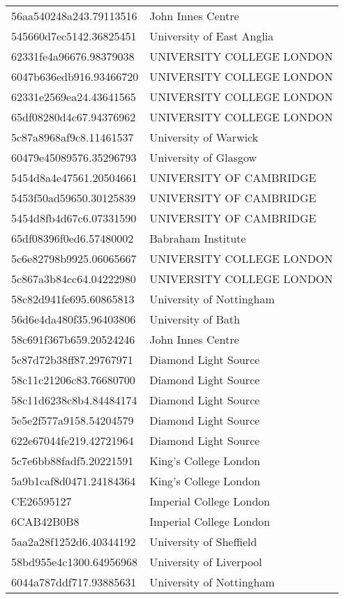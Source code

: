 \begin{tabular}{ll}
56aa540248a243.79113516 & John Innes Centre \\
545660d7ec5142.36825451 & University of East Anglia \\
62331fe4a96676.98379038 & UNIVERSITY COLLEGE LONDON \\
6047b636edb916.93466720 & UNIVERSITY COLLEGE LONDON \\
62331e2569ea24.43641565 & UNIVERSITY COLLEGE LONDON \\
65df08280d4c67.94376962 & UNIVERSITY COLLEGE LONDON \\
5c87a8968af9c8.11461537 & University of Warwick \\
60479e45089576.35296793 & University of Glasgow \\
5454d8a4e47561.20504661 & UNIVERSITY OF CAMBRIDGE \\
5453f50ad59650.30125839 & UNIVERSITY OF CAMBRIDGE \\
5454d8fb4d67c6.07331590 & UNIVERSITY OF CAMBRIDGE \\
65df08396f0ed6.57480002 & Babraham Institute \\
5c6e82798b9925.06065667 & UNIVERSITY COLLEGE LONDON \\
5c867a3b84cc64.04222980 & UNIVERSITY COLLEGE LONDON \\
58c82d941fe695.60865813 & University of Nottingham \\
56d6e4da480f35.96403806 & University of Bath \\
58c691f367b659.20524246 & John Innes Centre \\
5c87d72b38ff87.29767971 & Diamond Light Source \\
58c11c21206c83.76680700 & Diamond Light Source \\
58c11d6238c8b4.84484174 & Diamond Light Source \\
5e5e2f577a9158.54204579 & Diamond Light Source \\
622e67044fe219.42721964 & Diamond Light Source \\
5c7e6bb88fadf5.20221591 & King's College London \\
5a9b1caf8d0471.24184364 & King's College London \\
CE26595127 & Imperial College London \\
6CAB42B0B8 & Imperial College London \\
5aa2a28f1252d6.40344192 & University of Sheffield \\
58bd955e4c1300.64956968 & University of Liverpool \\
6044a787ddf717.93885631 & University of Nottingham \\

\end{tabular}
